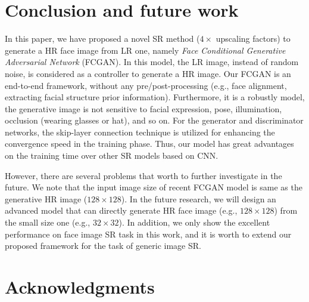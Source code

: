 \documentclass[conference,compsoc]{IEEEtran}
\begin{document}


\section{Conclusion and future work}
In this paper, we have proposed a novel SR method ($4\times$ upscaling factors) to generate a HR face image from LR one, namely \textit{Face Conditional Generative Adversarial Network} (FCGAN). In this model, the LR image, instead of random noise, is considered as a controller to generate a HR image. Our FCGAN is an end-to-end framework, without any pre/post-processing (e.g., face alignment, extracting facial structure prior information). Furthermore, it is a robustly model, the generative image is not sensitive to facial expression, pose, illumination, occlusion (wearing glasses or hat), and so on. For the generator and discriminator networks, the skip-layer connection technique is utilized for enhancing the convergence speed in the training phase. Thus, our model has great advantages on the training time over other SR models based on CNN.

However, there are several problems that worth to further investigate in the future. We note that the input image size of recent FCGAN model is same as the generative HR image ($128\times128$). In the future research, we will design an advanced model that can directly generate HR face image (e.g., $128\times128$) from the small size one (e.g., $32\times32$). In addition, we only show the excellent performance on face image SR task in this work, and it is worth to extend our proposed framework for the task of generic image SR.

%


\ifCLASSOPTIONcompsoc
  \section*{Acknowledgments}
\else
\end{document}
